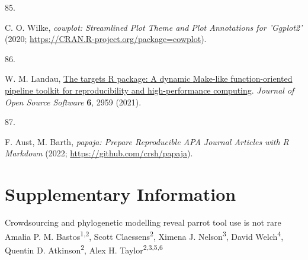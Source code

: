\documentclass[
  man,floatsintext]{apa6}
\newlength{\cslhangindent}
\newlength{\csllabelwidth}
\newlength{\cslentryspacingunit} %
\newenvironment{CSLReferences}[2] %
 {%
  \setlength{\parindent}{0pt}
  \ifodd #1
  \let\oldpar\par
  \def\par{\hangindent=\cslhangindent\oldpar}
  \fi
  \setlength{\parskip}{#2\cslentryspacingunit}
 }%
 {}
\newcommand{\CSLLeftMargin}[1]{\parbox[t]{\csllabelwidth}{#1}}
\newcommand{\CSLRightInline}[1]{\parbox[t]{\linewidth - \csllabelwidth}{#1}\break}
\begin{document}
\begin{CSLReferences}{0}{0}
\leavevmode{}%
\CSLLeftMargin{85. }%
\CSLRightInline{C. O. Wilke, \emph{{cowplot}: Streamlined Plot Theme and Plot Annotations for 'Ggplot2'} (2020; \url{https://CRAN.R-project.org/package=cowplot}).}

\leavevmode{}%
\CSLLeftMargin{86. }%
\CSLRightInline{W. M. Landau, \href{https://doi.org/10.21105/joss.02959}{The targets {R} package: A dynamic {M}ake-like function-oriented pipeline toolkit for reproducibility and high-performance computing}. \emph{Journal of Open Source Software} \textbf{6}, 2959 (2021).}

\leavevmode{}%
\CSLLeftMargin{87. }%
\CSLRightInline{F. Aust, M. Barth, \emph{{papaja}: {Prepare} Reproducible {APA} Journal Articles with {R Markdown}} (2022; \url{https://github.com/crsh/papaja}).}

\end{CSLReferences}

\endgroup

\newpage
\vspace*{60mm}

\renewcommand{\figurename}{Fig.}
\renewcommand{\tablename}{Table}
\renewcommand{\thefigure}{S\arabic{figure}} \setcounter{figure}{0}
\renewcommand{\thetable}{S\arabic{table}} \setcounter{table}{0}
\renewcommand{\theequation}{S\arabic{equation}} \setcounter{equation}{0}

\hypertarget{supplementary-information}{%
\section{\texorpdfstring{\textbf{Supplementary Information}}{Supplementary Information}}\label{supplementary-information}}

\setcounter{page}{1}
\centering

\noindent \hspace*{5mm} \small Crowdsourcing and phylogenetic modelling reveal parrot tool use is not rare \newline
\hspace*{1cm} \small Amalia P. M. Bastos\textsuperscript{1,2}, Scott Claessens\textsuperscript{2}, Ximena J. Nelson\textsuperscript{3}, David Welch\textsuperscript{4}, \newline
\hspace*{25mm} Quentin D. Atkinson\textsuperscript{2}, Alex H. Taylor\textsuperscript{2,3,5,6} \newline
\end{document}
